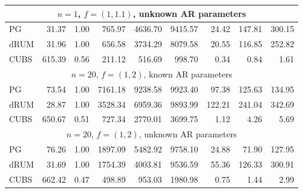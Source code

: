 \documentclass[12pt]{article}
\begin{document}
\begin{table}
\begin{tabular}{l r r r r r r r r }
\hline
\multicolumn{9}{c}{$n=1$, $f = (1,1.1)$, unknown AR parameters} \\
\hline
             PG   &    31.37 &     1.00 &    765.97 &   4636.70 &   9415.57 &     24.42 &    147.81 &    300.15 \\ 
           dRUM   &    31.96 &     1.00 &    656.58 &   3734.29 &   8079.58 &     20.55 &    116.85 &    252.82 \\ 
           CUBS   &   615.39 &     0.56 &    211.12 &    516.69 &    998.70 &      0.34 &      0.84 &      1.61
 \\ %

\hline
\multicolumn{9}{c}{$n=20$, $f = (1,2)$, known AR parameters} \\
\hline
             PG   &    73.54 &     1.00 &   7161.18 &   9238.58 &   9923.40 &     97.38 &    125.63 &    134.95 \\ 
           dRUM   &    28.87 &     1.00 &   3528.34 &   6959.36 &   9893.99 &    122.21 &    241.04 &    342.69 \\ 
           CUBS   &   650.67 &     0.51 &    727.34 &   2770.01 &   3699.75 &      1.12 &      4.26 &      5.69
 \\ %


\hline
\multicolumn{9}{c}{$n=20$, $f = (1,2)$, unknown AR parameters} \\
\hline
             PG   &    76.26 &     1.00 &   1897.09 &   5482.92 &   9758.10 &     24.88 &     71.90 &    127.95 \\ 
           dRUM   &    31.69 &     1.00 &   1754.39 &   4003.81 &   9536.59 &     55.36 &    126.33 &    300.91 \\ 
           CUBS   &   662.42 &     0.47 &    498.89 &    953.03 &   1980.98 &      0.75 &      1.44 &      2.99
 \\ %



\end{tabular}
\end{table}
\end{document}
